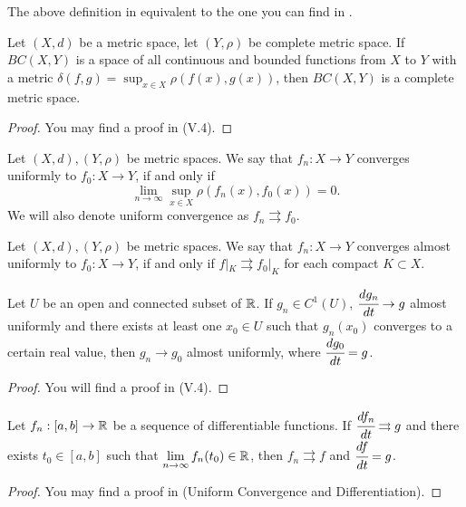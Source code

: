 \documentclass[main.tex]{subfiles}
\begin{document}
The above definition in equivalent to the one you can find in \cite{warner1983}. 

\begin{theorem}
\label{continous_functions_space_complete}
Let $(X, d)$ be a metric space, let $(Y, \rho)$ be complete metric space. If $BC(X, Y)$ is a space of all continuous and bounded functions from $X$ to $Y$ with a metric $\delta(f, g) = \sup_{x\in X} \rho(f(x), g(x))$, then $BC(X, Y)$ is a complete metric space.
\end{theorem}
\begin{proof}
You may find a proof in \cite{maurin1976} (V.4).
\end{proof}

\begin{definition}
Let $(X, d), (Y, \rho)$ be metric spaces. We say that $f_n:X\to Y$ converges uniformly to $f_0:X\to Y$, if and only if
\begin{equation}
    \lim_{n\to\infty} \sup_{x\in X}\rho(f_n(x), f_0(x)) = 0.
\end{equation}
We will also denote uniform convergence as $f_n \rightrightarrows f_0.$
\end{definition}
\begin{definition}
Let $(X, d), (Y, \rho)$ be metric spaces. We say that $f_n:X\to Y$ converges almost uniformly to $f_0:X\to Y$, if and only if $f|_K \rightrightarrows f_0|_K$ for each compact $K\subset X$.
\end{definition}
\begin{theorem}
Let $U$ be an open and connected subset of $\mathbb{R}$. If $g_n\in C^1(U)$, $\cfrac{dg_n}{dt}\to g$ almost uniformly and there exists at least one $x_0\in U$ such that $g_n(x_0)$ converges to a certain real value, then $g_n\to g_0$ almost uniformly, where $\cfrac{dg_0}{dt} = g$.
\end{theorem}
\begin{proof}
You will find a proof in \cite{maurin1976} (V.4).
\end{proof}
\begin{theorem}
\label{diff_closed1}
Let $f_n:[a, b]\to \mathbb{R}$ be a sequence of differentiable functions. If  $\cfrac{df_n}{dt} \rightrightarrows g$
and there exists $t_0 \in [a, b]$ such that $\lim\limits_{n\to\infty}f_n(t_0)\in \mathbb{R}$, then $f_n \rightrightarrows f$ and $\cfrac{df}{dt} = g$.
\end{theorem}
\begin{proof}
You may find a proof in \cite{rudin1976} (Uniform Convergence and Differentiation).
\end{proof}
\end{document}
